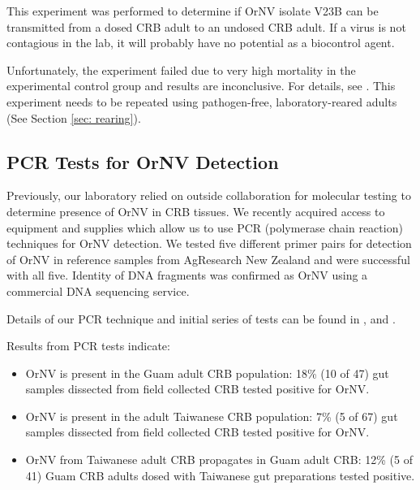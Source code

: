 \documentclass[12pt,
letterpaper,english,bibliography=totocnumbered, abstract=on]{scrartcl}
\begin{document}
This experiment was performed to determine if OrNV isolate V23B can be transmitted from a dosed CRB adult to an undosed CRB adult. If a virus is not contagious in the lab, it will probably have no potential as a biocontrol agent. 

Unfortunately, the experiment failed due to very high mortality in the experimental control group and results are inconclusive. For details, see \cite{grasela_guam_2020}. This experiment needs to be repeated using pathogen-free, laboratory-reared adults (See Section \ref{sec: rearing}).

\subsection{PCR Tests for OrNV Detection}
\label{sec: pcr}

Previously, our laboratory relied on outside collaboration for molecular testing to determine presence of OrNV in CRB tissues. We recently acquired access to equipment and supplies which allow us to use PCR (polymerase chain reaction) techniques for OrNV detection. We tested five different primer pairs for detection of OrNV in reference samples from AgResearch New Zealand and were successful with all five. Identity of DNA fragments was confirmed as OrNV using a commercial DNA sequencing service.

Details of our PCR technique and initial series of tests can be found in \cite{grasela_technical_2020}, 
\cite{grasela_technical_2020-1} and \cite{grasela_technical_2020-2}.

Results from PCR tests indicate:
\label{(subsec: pcr results)}

\begin{itemize}

\item OrNV is present in the Guam adult CRB population: 18\% (10 of 47) gut samples dissected from field collected CRB tested positive for OrNV.

\item  OrNV is present in the adult Taiwanese CRB population:  7\% (5 of 67) gut samples dissected from field collected CRB tested positive for OrNV. 

\item  OrNV from Taiwanese adult CRB propagates in Guam adult CRB: 12\% (5 of 41) Guam CRB adults dosed with Taiwanese gut preparations tested positive.   

\end{itemize}
\end{document}
